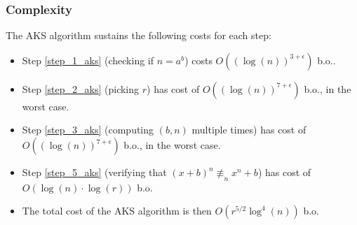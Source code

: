 \subsubsection{Complexity}
\begin{theorem}
    The AKS algorithm sustains the following costs for each step:
    \begin{itemize}
        \item Step \ref{step_1_aks} (checking if $n = a^{b}$) costs $O((\operatorname{log}(n))^{3 + \epsilon})$ b.o..
        \item Step \ref{step_2_aks} (picking $r$) has cost of $O((\operatorname{log}(n))^{7 + \epsilon})$ b.o., in the worst case.
        \item Step \ref{step_3_aks} (computing $(b,n)$ multiple times) has cost of $O((\operatorname{log}(n))^{7 + \epsilon})$ b.o., in the worst case.
        \item Step \ref{step_5_aks} (verifying that $(x + b)^{n} \not\equiv_{n} x^{n} + b$) has cost of $O(\operatorname{log}(n) \cdot \operatorname{log}(r))$ b.o.
        \item The total cost of the AKS algorithm is then $O(r^{5/2} \operatorname{log}^{4}(n))$ b.o.
    \end{itemize}
\end{theorem}
